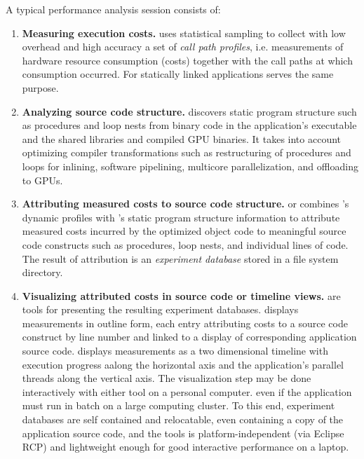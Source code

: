 \documentclass[english]{article}
\begin{document}
A typical performance analysis session consists of:
\begin{enumerate}
\item \textbf{Measuring execution costs.}
 uses statistical sampling to collect with low overhead and high accuracy
a set of \emph{call path profiles},
i.e. measurements of hardware resource consumption (costs) together with the call paths at which consumption occurred.
For statically linked applications  serves the same purpose.

\item \textbf{Analyzing source code structure.}
 discovers static program structure such as procedures and loop nests
from binary code in the application's executable and the shared libraries and compiled GPU binaries.
It takes into account optimizing compiler transformations such as restructuring of procedures and loops
for inlining, software pipelining, multicore parallelization, and offloading to GPUs.

\item \textbf{Attributing measured costs to source code structure.}
 or 
combines 's dynamic profiles
with 's static program structure information
to attribute measured costs incurred by the optimized object code
to meaningful source code constructs such as procedures, loop nests, and individual lines of code.
The result of attribution is an \emph{experiment database} stored in a file system directory.

\item \textbf{Visualizing attributed costs in source code or timeline views.}
are tools for presenting the resulting experiment databases.
 displays measurements in outline form,
each entry attributing costs to a source code construct by line number
and linked to a display of corresponding application source code.
 displays measurements as a two dimensional timeline
with execution progress aalong the horizontal axis
and the application's parallel threads along the vertical axis.
The visualization step may be done  interactively with either tool on a personal computer.
even if the application must run in batch on a large computing cluster.
To this end, experiment databases are self contained and relocatable,
even containing a copy of the application source code,
and the  tools
is platform-independent (via Eclipse RCP)
and lightweight enough for good interactive performance on a laptop.

\end{enumerate}
\end{document}
